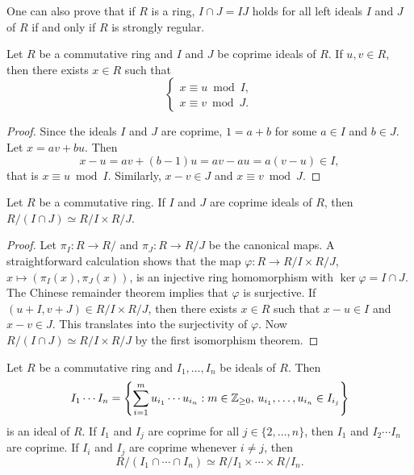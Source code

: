 One can also prove that if $R$ is a ring,
$I\cap J=IJ$ holds 
for all left ideals $I$ and $J$ of $R$ 
if and only if $R$ is strongly regular. 


\begin{theorem}
Let $R$ be a commutative ring and $I$ and $J$ be coprime ideals of $R$. 
If $u,v\in R$, then 
there exists $x\in R$ such that 
\[
\begin{cases}	
x\equiv u\bmod I,\\
x\equiv v\bmod J.
\end{cases}
\]
\end{theorem}

\begin{proof}
Since the ideals $I$ and $J$ are coprime, $1=a+b$ for some $a\in I$ and $b\in J$. 
Let $x=av+bu$. Then
\[
x-u=av+(b-1)u=av-au=a(v-u)\in I,
\]
that is $x\equiv u\bmod I$. Similarly, $x-v\in J$ and $x\equiv v\bmod J$.  	
\end{proof}

\begin{corollary}
	Let $R$ be a commutative ring. If $I$ and $J$ are coprime ideals of $R$, 
	then $R/(I\cap J)\simeq R/I\times R/J$.
\end{corollary}

\begin{proof}
	Let $\pi_I\colon R\to R/$ and $\pi_J\colon R\to R/J$ be the canonical maps. A straightforward
	calculation shows that the
	map $\varphi\colon R\to R/I\times R/J$, $x\mapsto (\pi_I(x),\pi_J(x))$, 
	is an injective ring homomorphism with $\ker\varphi=I\cap J$.
	The Chinese remainder theorem implies that $\varphi$ is surjective. If $(u+I,v+J)\in R/I\times R/J$, 
	then there exists $x\in R$ such that 
	$x-u\in I$ and $x-v\in J$. This translates into the surjectivity of $\varphi$. Now
	$R/(I\cap J)\simeq R/I\times R/J$ by the first isomorphism theorem. 
\end{proof}

Let $R$ be a commutative ring and $I_1,\dots,I_n$ be ideals of $R$. Then
\[
I_1\cdots I_n=\left\{
	\sum_{i=1}^mu_{i_1}\cdots u_{i_n}:m\in\mathbb{Z}_{\geq0},\,u_{i_1},\dots,u_{i_n}\in I_{i_j}
\right\}
\]
is an ideal of $R$. If $I_1$ and $I_j$ are coprime for all $j\in\{2,\dots,n\}$, 
then $I_1$ and $I_2\cdots I_n$ are coprime. If $I_i$ and $I_j$ are coprime
whenever $i\ne j$, then 
\[
R/(I_1\cap\cdots\cap I_n)\simeq R/I_1\times\cdots\times R/I_n.
\]

